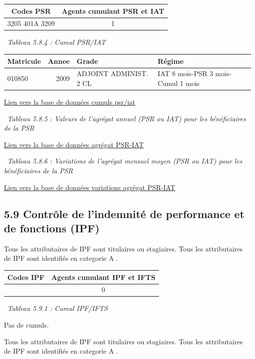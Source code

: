 \begin{longtable}[]{@{}cc@{}}
\toprule
Codes PSR & Agents cumulant PSR et IAT\tabularnewline
\midrule
\endhead
3205 401A 3209 & 1\tabularnewline
\bottomrule
\end{longtable}

~\emph{Tableau 5.8.4 : Cumul PSR/IAT}

\begin{longtable}[]{@{}lrll@{}}
\toprule
Matricule & Annee & Grade & Régime\tabularnewline
\midrule
\endhead
010850 & 2009 & ADJOINT ADMINIST. 2 CL & IAT 8 mois-PSR 3 mois-Cumul 1
mois\tabularnewline
\bottomrule
\end{longtable}

\href{../Bases/Reglementation/personnels.psr.iat.csv}{Lien vers la base de
données cumuls psr/iat}

~\emph{Tableau 5.8.5 : Valeurs de l'agrégat annuel (PSR ou IAT) pour les
bénéficiaires de la PSR}

\href{../Bases/Remunerations/beneficiaires.PSR.IAT.csv}{Lien vers la base
de données agrégat PSR-IAT}

~\emph{Tableau 5.8.6 : Variations de l'agrégat mensuel moyen (PSR ou
IAT) pour les bénéficiaires de la PSR}

\href{../Bases/Remunerations/beneficiaires.PSR.IAT.Variation.csv}{Lien vers
la base de données variations agrégat PSR-IAT}

\hypertarget{controle-de-lindemnite-de-performance-et-de-fonctions-ipf}{%
\subsection{5.9 Contrôle de l'indemnité de performance et de fonctions
(IPF)}\label{controle-de-lindemnite-de-performance-et-de-fonctions-ipf}}

Tous les attributaires de IPF sont titulaires ou stagiaires. Tous les
attributaires de IPF sont identifiés en categorie A .

\begin{longtable}[]{@{}cc@{}}
\toprule
Codes IPF & Agents cumulant IPF et IFTS\tabularnewline
\midrule
\endhead
& 0\tabularnewline
\bottomrule
\end{longtable}

~\emph{Tableau 5.9.1 : Cumul IPF/IFTS}

Pas de cumuls.

Tous les attributaires de IPF sont titulaires ou stagiaires. Tous les
attributaires de IPF sont identifiés en categorie A .

